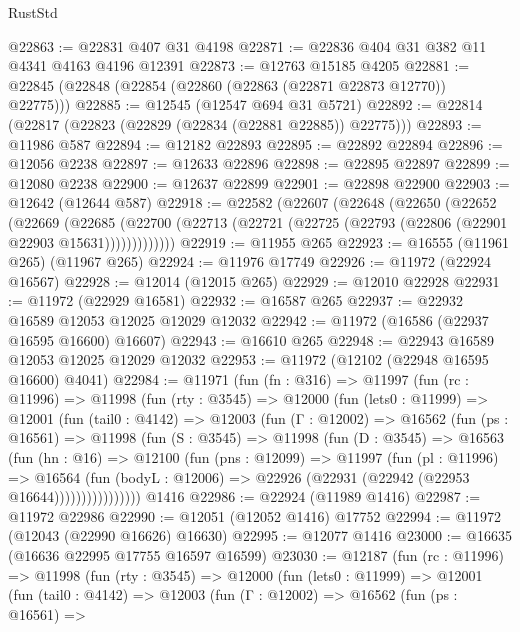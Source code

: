 \begin{lexlean}{RustStd}
\begin{coremodule}
@22863 := @22831 @407 @31 @4198
@22871 := @22836 @404 @31 @382 @11 @4341 @4163 @4196 @12391
@22873 := @12763 @15185 @4205
@22881 := @22845 (@22848 (@22854 (@22860 (@22863 (@22871 @22873 @12770)) @22775)))
@22885 := @12545 (@12547 @694 @31 @5721)
@22892 := @22814 (@22817 (@22823 (@22829 (@22834 (@22881 @22885)) @22775)))
@22893 := @11986 @587
@22894 := @12182 @22893
@22895 := @22892 @22894
@22896 := @12056 @2238
@22897 := @12633 @22896
@22898 := @22895 @22897
@22899 := @12080 @2238
@22900 := @12637 @22899
@22901 := @22898 @22900
@22903 := @12642 (@12644 @587)
@22918 := @22582
    (@22607
      (@22648
        (@22650
          (@22652
            (@22669
              (@22685
                (@22700 (@22713 (@22721 (@22725 (@22793 (@22806 (@22901 @22903 @15631)))))))))))))
@22919 := @11955 @265
@22923 := @16555 (@11961 @265) (@11967 @265)
@22924 := @11976 @17749
@22926 := @11972 (@22924 @16567)
@22928 := @12014 (@12015 @265)
@22929 := @12010 @22928
@22931 := @11972 (@22929 @16581)
@22932 := @16587 @265
@22937 := @22932 @16589 @12053 @12025 @12029 @12032
@22942 := @11972 (@16586 (@22937 @16595 @16600) @16607)
@22943 := @16610 @265
@22948 := @22943 @16589 @12053 @12025 @12029 @12032
@22953 := @11972 (@12102 (@22948 @16595 @16600) @4041)
@22984 := @11971
    (fun (fn : @316) =>
    @11997
      (fun (rc : @11996) =>
      @11998
        (fun (rty : @3545) =>
        @12000
          (fun (lets0 : @11999) =>
          @12001
            (fun (tail0 : @4142) =>
            @12003
              (fun (Γ : @12002) =>
              @16562
                (fun (ps : @16561) =>
                @11998
                  (fun (S : @3545) =>
                  @11998
                    (fun (D : @3545) =>
                    @16563
                      (fun (hn : @16) =>
                      @12100
                        (fun (pns : @12099) =>
                        @11997
                          (fun (pl : @11996) =>
                          @16564
                            (fun (bodyL : @12006) =>
                            @22926 (@22931 (@22942 (@22953 @16644))))))))))))))))
    @1416
@22986 := @22924 (@11989 @1416)
@22987 := @11972 @22986
@22990 := @12051 (@12052 @1416) @17752
@22994 := @11972 (@12043 (@22990 @16626) @16630)
@22995 := @12077 @1416
@23000 := @16635 (@16636 @22995 @17755 @16597 @16599)
@23030 := @12187
    (fun (rc : @11996) =>
    @11998
      (fun (rty : @3545) =>
      @12000
        (fun (lets0 : @11999) =>
        @12001
          (fun (tail0 : @4142) =>
          @12003
            (fun (Γ : @12002) =>
            @16562
              (fun (ps : @16561) =>

\end{coremodule}
\end{lexlean}
